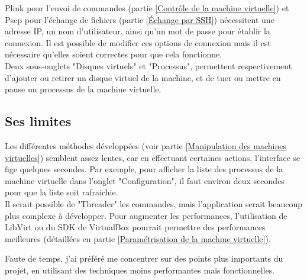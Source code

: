 Plink pour l'envoi de commandes (partie \ref{Contrôle de la machine virtuelle}) et Pscp pour l'échange de fichiers (partie \ref{Échange par SSH}) nécessitent une adresse IP, un nom d'utilisateur, ainsi qu'un mot de passe pour établir la connexion.
Il est possible de modifier ces options de connexion mais il est nécessaire qu'elles soient correctes pour que cela fonctionne.
\\ 


Deux sous-onglets "Disques virtuels" et "Processus", permettent respectivement d'ajouter ou retirer un disque virtuel de la machine, et de tuer ou mettre en pause un processus de la machine virtuelle.
\\





\subsection{Ses limites}

Les différentes méthodes développées (voir partie \ref{Manipulation des machines virtuelles}) semblent assez lentes, car en effectuant certaines actions, l'interface se fige quelques secondes.
Par exemple, pour afficher la liste des processus de la machine virtuelle dans l'onglet "Configuration", il faut environ deux secondes pour que la liste soit rafraichie.
\\


Il serait possible de "Threader" les commandes, mais l'application serait beaucoup plus complexe à développer.
Pour augmenter les performances, l'utilisation de LibVirt ou du SDK de VirtualBox pourrait permettre des performances meilleures (détaillées en partie \ref{Paramétrisation de la machine virtuelle}).

Faute de temps, j'ai préféré me concentrer sur des points plus importants du projet, en utilisant des techniques moins performantes mais fonctionnelles.
\\







